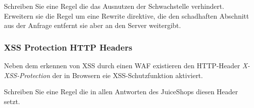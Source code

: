 Schreiben Sie eine Regel die das Ausnutzen der Schwachstelle verhindert.
Erweitern sie die Regel um eine Rewrite direktive, die den schadhaften Abschnitt aus der Anfrage entfernt sie aber an den Server weitergibt.

\subsubsection{XSS Protection HTTP Headers}

Neben dem erkennen von XSS durch einen WAF existieren den HTTP-Header \textit{X-XSS-Protection} der in Browsern eie XSS-Schutzfunktion aktiviert.

Schreiben Sie eine Regel die in allen Antworten des JuiceShops diesen Header setzt.

\pagebreak